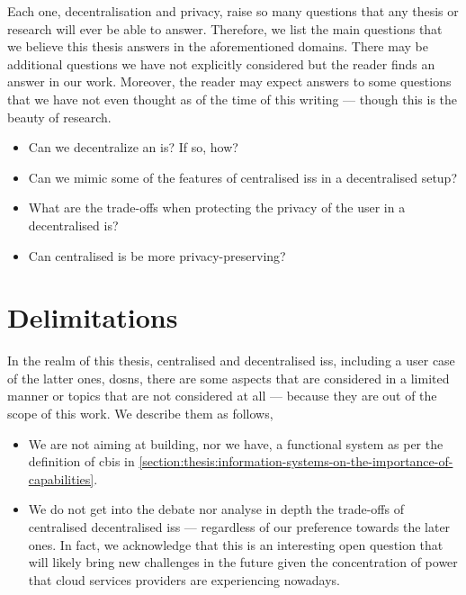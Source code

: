 Each one, decentralisation and privacy, raise so many questions that any thesis 
or research will ever be able to answer. Therefore, we list the main questions that 
we believe this thesis answers in the aforementioned domains. There may be additional 
questions we have not explicitly considered but the reader finds an answer in our 
work. Moreover, the reader may expect answers to some questions that we have not 
even thought as of the time of this writing --- though this is the beauty of research.

\begin{itemize}
    \item Can we decentralize an \ac{is}? If so, how?\\
    \item Can we mimic some of the features of centralised \acp{is} in a decentralised setup?\\
    \item What are the trade-offs when protecting the privacy of the user in a decentralised \ac{is}?\\
    \item Can centralised \ac{is} be more privacy-preserving?\\
\end{itemize}

\section{Delimitations}
    \label{section:delimitations}
In the realm of this thesis, centralised and decentralised \acp{is}, including a 
user case of the latter ones, \acp{dosn}, there are some aspects that are considered 
in a limited manner or topics that are not considered at all --- because they are 
out of the scope of this work. We describe them as follows,

\begin{itemize}
    \item We are not aiming at building, nor we have, a functional system as per 
    the definition of \ac{cbis} in \cref{section:thesis:information-systems-on-the-importance-of-capabilities}.

    \item We do not get into the debate nor analyse in depth the trade-offs of centralised 
    \vs decentralised \acp{is} --- regardless of our preference towards the later 
    ones. In fact, we acknowledge that this is an interesting open question that 
    will likely bring new challenges in the future given the concentration of power 
    that cloud services providers are experiencing nowadays.
\end{itemize}

